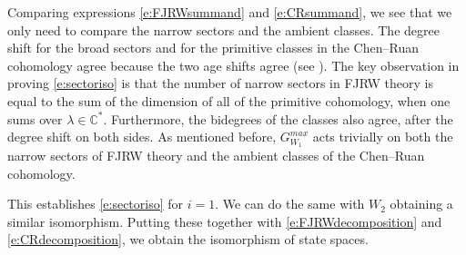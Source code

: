 \documentclass[10pt, letterpaper]{amsart}
\theoremstyle{remark}
\newcommand{\CC}{\mathbb C}
\newcommand{\sQ}{\mathscr{Q}}
\begin{document}
Comparing expressions \eqref{e:FJRWsummand} and \eqref{e:CRsummand}, we see that we only need to compare the narrow sectors and the ambient classes. The degree shift for the broad sectors and for the primitive classes in the Chen--Ruan cohomology agree because the two age shifts agree (see \cite[Lemma 22]{ChR}). The key observation in proving \eqref{e:sectoriso} is that the number of narrow sectors in FJRW theory is equal to the sum of the dimension of all of the primitive cohomology, when one sums over $\lambda\in \CC^*$. Furthermore, the bidegrees of the classes also agree, after the degree shift on both sides. As mentioned before, $G_{W_1}^{max}$ acts trivially on both the narrow sectors of FJRW theory and the ambient classes of the Chen--Ruan cohomology. 

This establishes \eqref{e:sectoriso} for $i=1$. We can do the same with $W_2$ obtaining a similar isomorphism. Putting these together with \eqref{e:FJRWdecomposition} and \eqref{e:CRdecomposition}, we obtain the isomorphism of state spaces. 





\end{document}
